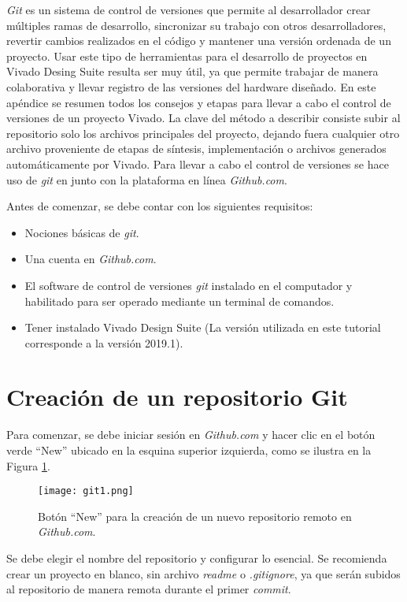 \textit{Git} es un sistema de control de versiones que permite al desarrollador crear múltiples ramas de desarrollo, sincronizar su trabajo con otros desarrolladores, revertir cambios realizados en el código y mantener una versión ordenada de un proyecto. Usar este tipo de herramientas para el desarrollo de proyectos en Vivado Desing Suite resulta ser muy útil, ya que permite trabajar de manera colaborativa y llevar registro de las versiones del hardware diseñado. En este apéndice se resumen todos los consejos y etapas para llevar a cabo el control de versiones de un proyecto Vivado. La clave del método a describir consiste subir al repositorio solo los archivos principales del proyecto, dejando fuera cualquier otro archivo proveniente de etapas de síntesis, implementación o archivos generados automáticamente por Vivado. Para llevar a cabo el control de versiones se hace uso de \textit{git} en junto con la plataforma en línea \textit{Github.com}.

Antes de comenzar, se debe contar con los siguientes requisitos:
\begin{itemize}
	\item Nociones básicas de \textit{git}.
	\item Una cuenta en \textit{Github.com}.
	\item El software de control de versiones \textit{git} instalado en el computador y habilitado para ser operado mediante un terminal de comandos.
	\item Tener instalado Vivado Design Suite (La versión utilizada en este tutorial corresponde a la versión 2019.1).
\end{itemize}

\section{Creación de un repositorio Git}

	Para comenzar, se debe iniciar sesión en \textit{Github.com} y hacer clic en el botón verde  ``New'' ubicado en la esquina superior izquierda, como se ilustra en la Figura \ref{fig:git1}.
	
	\begin{figure}[ht]
		\centering
		\texttt{[image: git1.png]}
		\caption{Botón ``New'' para la creación de un nuevo repositorio remoto en \textit{Github.com}.}
		\label{fig:git1}
	\end{figure}
	
	Se debe elegir el nombre del repositorio y configurar lo esencial. Se recomienda crear un proyecto en blanco, sin archivo \textit{readme} o \textit{.gitignore}, ya que serán subidos al repositorio de manera remota durante el primer \textit{commit}.

